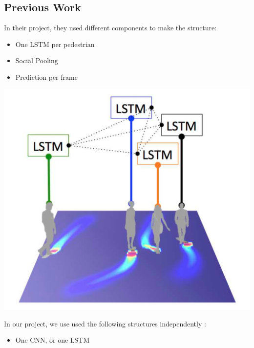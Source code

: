 \documentclass[a0,portrait]{a0poster}
\begin{document}
\begin{multicols}{2}

\color{DarkSlateGray} %

\section*{Previous Work}
\begin{center}
\begin{minipage}[lH]{0.45\linewidth-}
In their project, they used different components to make the structure:\\
\begin{itemize}
\item One LSTM per pedestrian
\item Social Pooling
\item Prediction per frame
\end{itemize}
\centerline {\includegraphics[scale = 0.5]{figure/socialLSTM}}
\end{minipage}
%
\begin{minipage}[H]{0.45\linewidth-}
In our project, we use used the following structures independently :\\
\vspace{1.5cm}
\begin{itemize}
\item One CNN, or one LSTM

\end{itemize}
\end{minipage}
\end{center}
\end{multicols}
\end{document}
